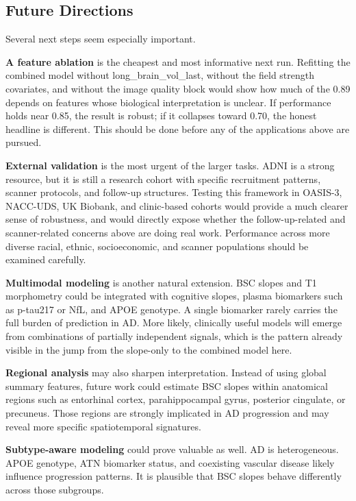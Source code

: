 \documentclass[blue]{ludusofficial}  %
\begin{document}
\subsection{Future Directions}

Several next steps seem especially important.

\textbf{A feature ablation} is the cheapest and most informative next run. Refitting the combined model without long\_brain\_vol\_last, without the field strength covariates, and without the image quality block would show how much of the 0.89 depends on features whose biological interpretation is unclear. If performance holds near 0.85, the result is robust; if it collapses toward 0.70, the honest headline is different. This should be done before any of the applications above are pursued.

\textbf{External validation} is the most urgent of the larger tasks. ADNI is a strong resource, but it is still a research cohort with specific recruitment patterns, scanner protocols, and follow-up structures. Testing this framework in OASIS-3, NACC-UDS, UK Biobank, and clinic-based cohorts would provide a much clearer sense of robustness, and would directly expose whether the follow-up-related and scanner-related concerns above are doing real work. Performance across more diverse racial, ethnic, socioeconomic, and scanner populations should be examined carefully.

\textbf{Multimodal modeling} is another natural extension. BSC slopes and T1 morphometry could be integrated with cognitive slopes, plasma biomarkers such as p-tau217 or NfL, and APOE genotype. A single biomarker rarely carries the full burden of prediction in AD. More likely, clinically useful models will emerge from combinations of partially independent signals, which is the pattern already visible in the jump from the slope-only to the combined model here.

\textbf{Regional analysis} may also sharpen interpretation. Instead of using global summary features, future work could estimate BSC slopes within anatomical regions such as entorhinal cortex, parahippocampal gyrus, posterior cingulate, or precuneus. Those regions are strongly implicated in AD progression and may reveal more specific spatiotemporal signatures.

\textbf{Subtype-aware modeling} could prove valuable as well. AD is heterogeneous. APOE genotype, ATN biomarker status, and coexisting vascular disease likely influence progression patterns. It is plausible that BSC slopes behave differently across those subgroups.
\end{document}
